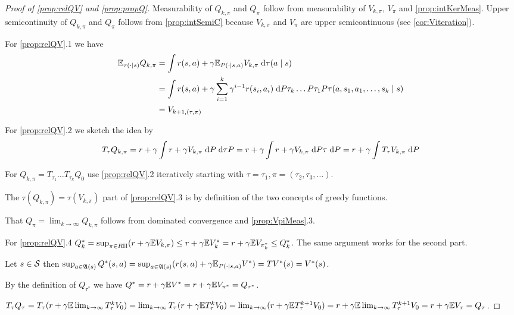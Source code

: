\begin{proof}[Proof of \cref{prop:relQV} and \cref{prop:propQ}]
  Measurability of $Q_{k, \pi}$ and $Q_\pi$
  follow from measurability of $V_{k, \pi}$, $V_{\pi}$
  and \cref{prop:intKerMeas}.
  Upper semicontinuity of $Q_{k, \pi}$ and $Q_\pi$ follows
  from \cref{prop:intSemiC} because $V_{k, \pi}$ and $V_\pi$ are
  upper semicontinuous (see \cref{cor:Viteration}).

  For \cref{prop:relQV}.1 we have \begin{align*}
    \mathbb{E}_{\tau(\cdot \mid s)} Q_{k, \pi}
    &= \int r(s,a) + \gamma \mathbb{E}_{P(\cdot \mid s, a)} V_{k, \pi}
    \; \mathrm{d} \tau(a \mid s)
    \\ &= \int r(s,a) + \gamma \sum_{i=1}^{k} \gamma^{i-1} r(s_i, a_i)
    \; \mathrm{d} P \tau_k \dots P\tau_1 P\tau(a, s_1, a_1, \dots, s_k \mid s)
  \\ &= V_{k+1, (\tau, \pi)} \end{align*}
  
  For \cref{prop:relQV}.2 we sketch the idea by
  \begin{align*}
    T_\tau Q_{k, \pi} = r + \gamma \int r + \gamma V_{k, \pi}
    \; \mathrm{d} P \; \mathrm{d} \tau P
    = r + \gamma \int r + \gamma V_{k, \pi} \; \mathrm{d} P \tau \; \mathrm{d} P
    = r + \gamma \int T_\tau V_{k, \pi} \; \mathrm{d} P
  \end{align*}
  
  For $Q_{k,\pi} = T_{\tau_1} \dots T_{\tau_k} Q_0$ use \cref{prop:relQV}.2
  iteratively starting with
  $\tau = \tau_1, \pi = (\tau_2, \tau_3, \dots)$.
  
  The $\tau(Q_{k, \pi}) = \tau(V_{k, \pi})$ part of \cref{prop:relQV}.3
  is by definition of the two concepts of
  greedy functions.

  That $Q_\pi = \lim_{k \to \infty} Q_{k, \pi}$
  follows from dominated convergence and
  \cref{prop:VpiMeas}.3.

  For \cref{prop:relQV}.4 $Q_k^* = \sup_{\pi \in R\Pi} (r + \gamma \mathbb{E} V_{k,\pi})
  \leq r + \gamma \mathbb{E} V_k^* = r + \gamma \mathbb{E} V_{\pi_k^*}
  \leq Q_k^*$. The same argument works for the second part.

  Let $s \in \mathcal{S}$ then $\sup_{a \in \frak{A}(s)} Q^*(s, a) = 
  \sup_{a \in \frak{A}(s)} (r(s, a) + \gamma \mathbb{E}_{P(\cdot \mid s, a)} V^*)
  = T V^*(s) = V^*(s)$.
  
  By the definition of $Q_{\tau^*}$ we have
  $Q^* = r + \gamma \mathbb{E} V^* = r + \gamma \mathbb{E} V_{\pi^*} = Q_{\tau^*}$.

  $T_\tau Q_\tau = T_\tau (r + \gamma \mathbb{E} \lim_{k\to\infty} T_\tau^k V_0)
  = \lim_{k\to\infty} T_\tau (r + \gamma \mathbb{E} T_\tau^k V_0)
  = \lim_{k\to\infty} (r + \gamma \mathbb{E} T_\tau^{k+1} V_0)
  = r + \gamma \mathbb{E} \lim_{k\to\infty} T^{k+1}_\tau V_0
  = r + \gamma \mathbb{E} V_\tau = Q_\tau$.


\end{proof}
